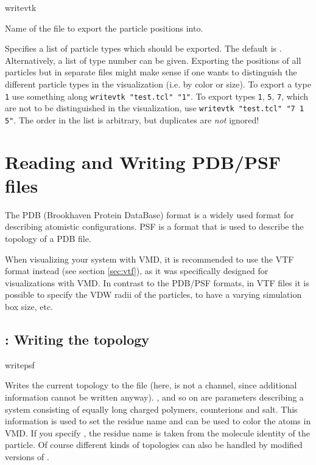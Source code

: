 \begin{essyntax}
  writevtk  
\end{essyntax}

\begin{arguments}
\item[\var{filename}]
  Name of the file to export the particle positions into.
\item[\opt{\alt{all \asep \var{type}}}] Specifies a list of particle
  types which should be exported. The default is
  . Alternatively, a list of type number can be
  given. Exporting the positions of all particles but in separate
  files might make sense if one wants to distinguish the different
  particle types in the visualization (i.e. by color or size).  To
  export a type \texttt{1} use something along \texttt{writevtk
    "test.tcl" "1"}.  To export types \texttt{1}, \texttt{5},
  \texttt{7}, which are not to be distinguished in the visualization,
  use \texttt{writevtk "test.tcl" "7 1 5"}.  The order in the list is
  arbitrary, but duplicates are \emph{not} ignored!
\end{arguments}

\section{Reading and Writing PDB/PSF files}
The PDB (Brookhaven Protein DataBase) format is a widely used format
for describing atomistic configurations. PSF is a format that is used
to describe the topology of a PDB file. 

When visualizing your system with VMD, it is recommended to use the
VTF format instead (see section \ref{sec:vtf}), as it was specifically
designed for visualizations with VMD. In contrast to the PDB/PSF
formats, in VTF files it is possible to specify the VDW radii of the
particles, to have a varying simulation box size, etc.

\subsection{: Writing the topology}

\begin{essyntax}
  writepsf     
   
\end{essyntax}
Writes the current topology to the file  (here, 
is not a channel, since additional information cannot be written
anyway).  ,  and so on are parameters describing a
system consisting of equally long charged polymers, counterions and
salt.  This information is used to set the residue name and can be
used to color the atoms in VMD. If you specify , the
residue name is taken from the molecule identity of the particle. Of
course different kinds of topologies can also be handled by modified
versions of .


